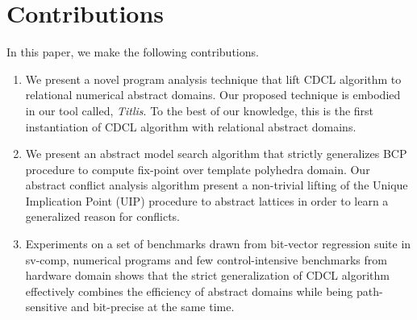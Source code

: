 \section{Contributions}
In this paper, we make the following contributions.
\begin{enumerate}
\item We present a novel program analysis technique that 
lift CDCL algorithm to relational numerical abstract domains.   
Our proposed technique is embodied in our tool called, {\em Titlis}.  
To the best of our knowledge, this is the first instantiation of CDCL 
algorithm with relational abstract domains. 

\item We present an abstract model search algorithm that strictly 
generalizes BCP procedure to compute fix-point over template polyhedra 
domain.  Our abstract conflict analysis algorithm present a non-trivial 
lifting of the Unique Implication Point (UIP) procedure to abstract 
lattices in order to learn a generalized reason for conflicts.  
 
\item  Experiments on a set of benchmarks drawn from bit-vector 
regression suite in sv-comp, numerical programs and few 
control-intensive benchmarks from hardware domain shows that 
the strict generalization of CDCL algorithm effectively combines 
the efficiency of abstract domains while being path-sensitive and 
bit-precise at the same time.  
\end{enumerate}
